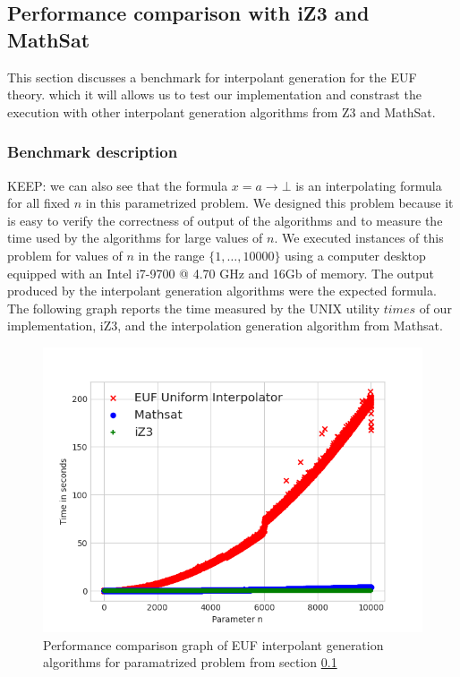 \subsection{Performance comparison with iZ3 and MathSat}\label{performance_euf}

This section discusses a benchmark for interpolant generation
for the EUF theory.
which it will allows us to test 
our implementation and constrast the execution with 
other interpolant generation
algorithms from Z3 and MathSat.

\subsubsection{Benchmark description}



KEEP:
we can also see that the formula $x = a \rightarrow \bot$ is an 
interpolating formula for all fixed $n$ in this parametrized problem.
We designed this problem because it is easy to verify the 
correctness of output of the algorithms and to measure 
the time used by the algorithms for large values of $n$. 
We executed instances of this problem for values of $n$
in the range $\{1, \dots, 10000\}$ using a computer desktop
equipped with an Intel i7-9700 @ 4.70 GHz and 16Gb of memory. 
The output produced by the interpolant generation algorithms
were the expected formula.
The following graph reports the time measured by the UNIX
utility $times$ of our implementation, iZ3, and the interpolation 
generation algorithm from Mathsat.

\begin{figure}
  \centering
  \includegraphics[scale=0.9]{figures/eufi_performance_graph}
  \caption{Performance comparison graph of EUF interpolant generation
  algorithms for paramatrized problem from section \ref{performance_euf}} 
  \label{performance_graph_euf}
\end{figure}

